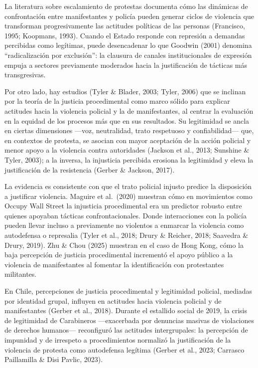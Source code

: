 \documentclass[
  13pt,
]{article}
\begin{document}
La literatura sobre escalamiento de protestas documenta cómo las
dinámicas de confrontación entre manifestantes y policía pueden generar
ciclos de violencia que transforman progresivamente las actitudes
políticas de las personas (Francisco, 1995; Koopmans, 1993). Cuando el
Estado responde con represión a demandas percibidas como legítimas,
puede desencadenar lo que Goodwin (2001) denomina ``radicalización por
exclusión'': la clausura de canales institucionales de expresión empuja
a sectores previamente moderados hacia la justificación de tácticas más
transgresivas.

Por otro lado, hay estudios (Tyler \& Blader, 2003; Tyler, 2006) que se
inclinan por la teoría de la justicia procedimental como marco sólido
para explicar actitudes hacia la violencia policial y la de
manifestantes, al centrar la evaluación en la equidad de los procesos
más que en sus resultados. Su legitimidad se ancla en ciertas
dimensiones ---voz, neutralidad, trato respetuoso y confiabilidad---
que, en contextos de protesta, se asocian con mayor aceptación de la
acción policial y menor apoyo a la violencia contra autoridades (Jackson
et al., 2013; Sunshine \& Tyler, 2003); a la inversa, la injusticia
percibida erosiona la legitimidad y eleva la justificación de la
resistencia (Gerber \& Jackson, 2017).

La evidencia es consistente con que el trato policial injusto predice la
disposición a justificar violencia. Maguire et al.~(2020) muestran cómo
en movimientos como Occupy Wall Street la injusticia procedimental era
un predictor robusto entre quienes apoyaban tácticas confrontacionales.
Donde interacciones con la policía pueden llevar incluso a previamente
no violentos a enmarcar la violencia como autodefensa o represalia
(Tyler et al., 2018; Drury \& Reicher, 2018; Saavedra \& Drury, 2019).
Zhu \& Chou (2025) muestran en el caso de Hong Kong, cómo la baja
percepción de justicia procedimental incrementó el apoyo público a la
violencia de manifestantes al fomentar la identificación con
protestantes militantes.

En Chile, percepciones de justicia procedimental y legitimidad policial,
mediadas por identidad grupal, influyen en actitudes hacia violencia
policial y de manifestantes (Gerber et al., 2018). Durante el estallido
social de 2019, la crisis de legitimidad de Carabineros ---exacerbada
por denuncias masivas de violaciones de derechos humanos--- reconfiguró
las actitudes intergrupales: la percepción de impunidad y de irrespeto a
procedimientos normalizó la justificación de la violencia de protesta
como autodefensa legítima (Gerber et al., 2023; Carrasco Paillamilla \&
Disi Pavlic, 2023).
\end{document}
